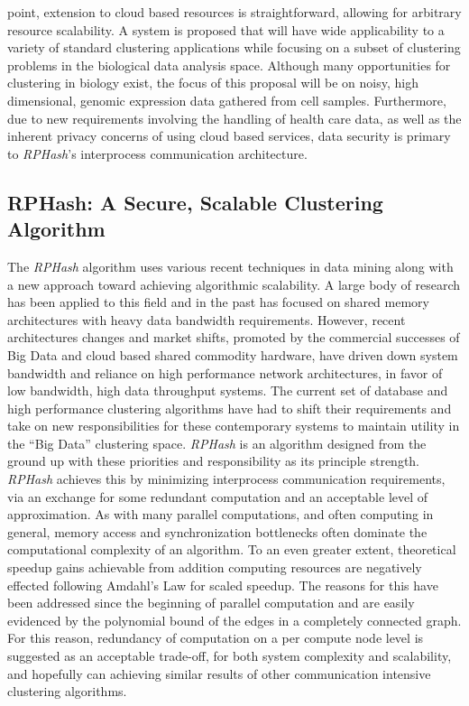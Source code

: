 \documentclass[a4paper,10pt]{article}
\begin{document}
point, extension to cloud based resources is straightforward, allowing for
arbitrary resource scalability.  A system is proposed that will have wide
applicability to a variety of standard clustering applications while focusing
on a subset of clustering problems in the biological data analysis space.
Although many opportunities for clustering in biology exist, the focus of
this proposal will be on noisy, high dimensional, genomic expression data
gathered from cell samples\cite{anders2010differential}.  Furthermore, due
to new requirements involving the handling of health care data, as well as
the inherent privacy concerns of using cloud based services, data security
is primary to \emph{RPHash}'s interprocess communication architecture.

\subsection{RPHash: A Secure, Scalable Clustering Algorithm} The
\emph{RPHash} algorithm uses various recent techniques in data mining
along with a new approach toward achieving algorithmic scalability.
A large body of research has been applied to this field and in the past
has focused on shared memory architectures with heavy data bandwidth
requirements\cite{Zaki2000,distributeddata,parclus}.  However, recent
architectures changes and market shifts, promoted by the commercial successes
of Big Data and cloud based shared commodity hardware, have driven down
system bandwidth and reliance on high performance network architectures, in
favor of low bandwidth, high data throughput systems\cite{mapreduce,hadoop}.
The current set of database and high performance clustering algorithms have
had to shift their requirements and take on new responsibilities for these
contemporary systems to maintain utility in the ``Big Data'' clustering space.
\emph{RPHash} is an algorithm designed from the ground up with these
priorities and responsibility as its principle strength.  \emph{RPHash}
achieves this by minimizing interprocess communication requirements,
via an exchange for some redundant computation and an acceptable level
of approximation.  As with many parallel computations, and often computing
in general, memory access and synchronization bottlenecks often dominate
the computational complexity of an algorithm.  To an even greater extent,
theoretical speedup gains achievable from addition computing resources are
negatively effected following Amdahl's Law for scaled speedup\cite{Amdahl}.
The reasons for this have been addressed since the beginning of parallel
computation and are easily evidenced by the polynomial bound of the edges in
a completely connected graph.  For this reason, redundancy of computation
on a per compute node level is suggested as an acceptable trade-off, for
both system complexity and scalability, and hopefully can achieving similar
results of other communication intensive clustering algorithms.
\end{document}

